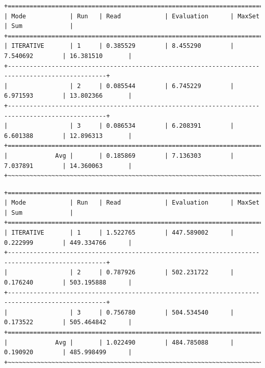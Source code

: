 \documentclass[draft,final]{vutinfth} %
\begin{document}
\begin{lstlisting}[float,basicstyle=\tiny,caption={Benchmark ITERATIVE, Datei: lubm-ex-20-15.sparql.xml},label={lst:bi15}]
+=================================================================================================+
| Mode            | Run   | Read            | Evaluation      | MaxSet          | Sum             | 
+=================================================================================================+
| ITERATIVE       | 1     | 0.385529        | 8.455290        | 7.540692        | 16.381510       | 
+-------------------------------------------------------------------------------------------------+
|                 | 2     | 0.085544        | 6.745229        | 6.971593        | 13.802366       | 
+-------------------------------------------------------------------------------------------------+
|                 | 3     | 0.086534        | 6.208391        | 6.601388        | 12.896313       | 
+=================================================================================================+
|             Avg |       | 0.185869        | 7.136303        | 7.037891        | 14.360063       |
+~~~~~~~~~~~~~~~~~~~~~~~~~~~~~~~~~~~~~~~~~~~~~~~~~~~~~~~~~~~~~~~~~~~~~~~~~~~~~~~~~~~~~~~~~~~~~~~~~+
\end{lstlisting}

\begin{lstlisting}[float,basicstyle=\tiny,caption={Benchmark ITERATIVE, Datei: lubm-ex-20-17.sparql.xml},label={lst:bi17}]
+=================================================================================================+
| Mode            | Run   | Read            | Evaluation      | MaxSet          | Sum             | 
+=================================================================================================+
| ITERATIVE       | 1     | 1.522765        | 447.589002      | 0.222999        | 449.334766      | 
+-------------------------------------------------------------------------------------------------+
|                 | 2     | 0.787926        | 502.231722      | 0.176240        | 503.195888      | 
+-------------------------------------------------------------------------------------------------+
|                 | 3     | 0.756780        | 504.534540      | 0.173522        | 505.464842      | 
+=================================================================================================+
|             Avg |       | 1.022490        | 484.785088      | 0.190920        | 485.998499      |
+~~~~~~~~~~~~~~~~~~~~~~~~~~~~~~~~~~~~~~~~~~~~~~~~~~~~~~~~~~~~~~~~~~~~~~~~~~~~~~~~~~~~~~~~~~~~~~~~~+
\end{lstlisting}
\end{document}
